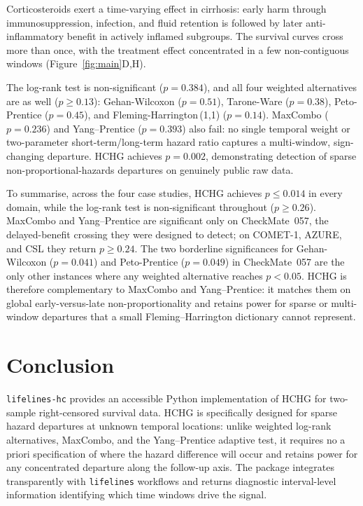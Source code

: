 \documentclass[unnumsec,webpdf,contemporary,large]{oup-authoring-template}
\begin{document}
Corticosteroids exert a time-varying effect in cirrhosis: early harm through
immunosuppression, infection, and fluid retention is followed by later
anti-inflammatory benefit in actively inflamed subgroups. The survival
curves cross more than once, with the treatment effect concentrated in a
few non-contiguous windows (Figure~\ref{fig:main}D,H).

The log-rank test is non-significant ($p = 0.384$), and all four weighted
alternatives are as well ($p \geq 0.13$): Gehan-Wilcoxon ($p = 0.51$),
Tarone-Ware ($p = 0.38$), Peto-Prentice ($p = 0.45$), and
Fleming-Harrington\,(1,1) ($p = 0.14$). MaxCombo ($p = 0.236$) and
Yang--Prentice ($p = 0.393$) also fail: no single temporal weight or
two-parameter short-term/long-term hazard ratio captures a multi-window,
sign-changing departure. HCHG achieves
$p = 0.002$, demonstrating detection of sparse non-proportional-hazards departures on genuinely public raw data.

To summarise, across the four case studies, HCHG achieves $p \leq 0.014$ in every domain,
while the log-rank test is non-significant throughout ($p \geq 0.26$). MaxCombo and Yang--Prentice are significant only on CheckMate~057, the delayed-benefit crossing they were designed to detect; on COMET-1, AZURE, and CSL they return $p \geq 0.24$. The
two borderline significances for Gehan-Wilcoxon ($p = 0.041$) and
Peto-Prentice ($p = 0.049$) in CheckMate~057 are the only other instances where
any weighted alternative reaches $p < 0.05$. HCHG is therefore complementary to MaxCombo and Yang--Prentice: it matches them on global early-versus-late non-proportionality and retains power for sparse or multi-window departures that a small Fleming--Harrington dictionary cannot represent. 


\section{Conclusion}

\texttt{lifelines-hc} provides an accessible Python implementation of
HCHG for two-sample right-censored survival data. HCHG is specifically
designed for sparse hazard departures at unknown temporal locations:
unlike weighted log-rank alternatives, MaxCombo, and the Yang--Prentice
adaptive test, it requires no a priori
specification of where the hazard difference will occur and retains
power for any concentrated departure along the follow-up axis. The
package integrates transparently with \texttt{lifelines} workflows and
returns diagnostic interval-level information identifying which time
windows drive the signal.
\end{document}
